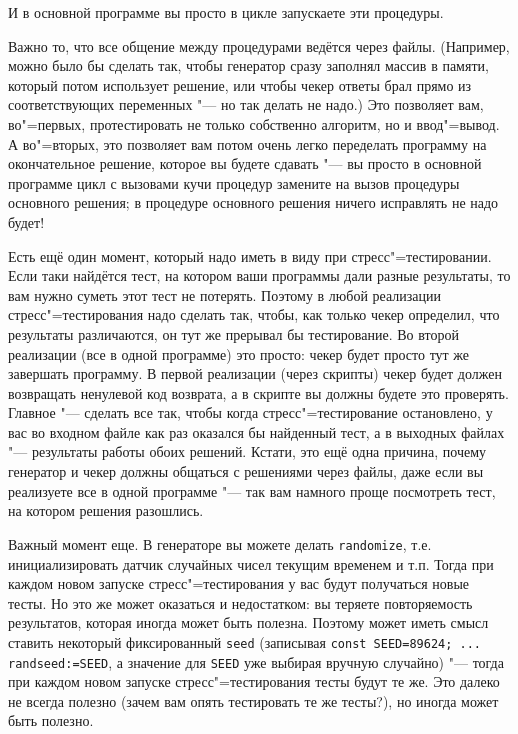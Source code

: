\documentclass[a4paper,10pt]{problems}
\begin{document}
И в основной программе вы просто в цикле запускаете эти процедуры.

Важно то, что все общение между процедурами ведётся через файлы. 
(Например, можно было бы сделать так, чтобы генератор сразу заполнял массив в памяти, который потом использует решение,
или чтобы чекер ответы брал прямо из соответствующих переменных "--- но так делать не надо.)
Это позволяет вам, во"=первых, протестировать не только собственно алгоритм, но и ввод"=вывод.
А во"=вторых, это позволяет вам потом очень легко переделать программу на окончательное решение, которое вы будете сдавать "---
вы просто в основной программе цикл с вызовами кучи процедур замените на вызов процедуры основного решения; 
в процедуре основного решения ничего исправлять не надо будет!

Есть ещё один момент, который надо иметь в виду при стресс"=тестировании. 
Если таки найдётся тест, на котором ваши программы дали разные результаты, то вам нужно суметь этот тест не потерять. 
Поэтому в любой реализации стресс"=тестирования надо сделать так, чтобы, как только чекер определил, что результаты различаются,
он тут же прерывал бы тестирование. 
Во второй реализации (все в одной программе) это просто: чекер будет просто тут же завершать программу.
В первой реализации (через скрипты) чекер будет должен возвращать ненулевой код возврата, 
а в скрипте вы должны будете это проверять. 
Главное "--- сделать все так, чтобы когда стресс"=тестирование остановлено, у вас во входном файле
как раз оказался бы найденный тест, а в выходных файлах "--- результаты работы обоих решений.
Кстати, это ещё одна причина, почему генератор и чекер должны общаться с решениями через файлы, даже если вы реализуете все в одной программе "---
так вам намного проще посмотреть тест, на котором решения разошлись.

Важный момент еще. В генераторе вы можете делать \verb`randomize`, т.е. инициализировать датчик случайных чисел текущим временем и т.п.
Тогда при каждом новом запуске стресс"=тестирования у вас будут получаться новые тесты. 
Но это же может оказаться и недостатком: вы теряете повторяемость результатов, которая иногда может быть полезна.
Поэтому может иметь смысл ставить некоторый фиксированный \verb`seed` (записывая \verb`const SEED=89624; ... randseed:=SEED`,
а значение для \verb`SEED` уже выбирая вручную случайно) "--- тогда при каждом новом запуске стресс"=тестирования
тесты будут те же. Это далеко не всегда полезно (зачем вам опять тестировать те же тесты?), но иногда может быть полезно.
\end{document}
